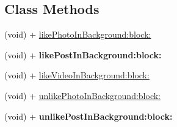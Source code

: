 \subsection*{Class Methods}
\begin{DoxyCompactItemize}
\item 
(void) + \hyperlink{interface_e_s_utility_aa8c4c295c11f525bc5fca75dda608d07}{like\+Photo\+In\+Background\+:block\+:}
\item 
\hypertarget{interface_e_s_utility_a1adfdb49abc9f64d7ca8fc99bad1ae19}{}(void) + {\bfseries like\+Post\+In\+Background\+:block\+:}\label{interface_e_s_utility_a1adfdb49abc9f64d7ca8fc99bad1ae19}

\item 
(void) + \hyperlink{interface_e_s_utility_ad351b5cca16967e8394338aeee2879b0}{like\+Video\+In\+Background\+:block\+:}
\item 
(void) + \hyperlink{interface_e_s_utility_a95a4dab9a77c05252069a38200a264f6}{unlike\+Photo\+In\+Background\+:block\+:}
\item 
\hypertarget{interface_e_s_utility_a79860359578fe90a1e81b029e6c38ccb}{}(void) + {\bfseries unlike\+Post\+In\+Background\+:block\+:}\label{interface_e_s_utility_a79860359578fe90a1e81b029e6c38ccb}


\end{DoxyCompactItemize}
